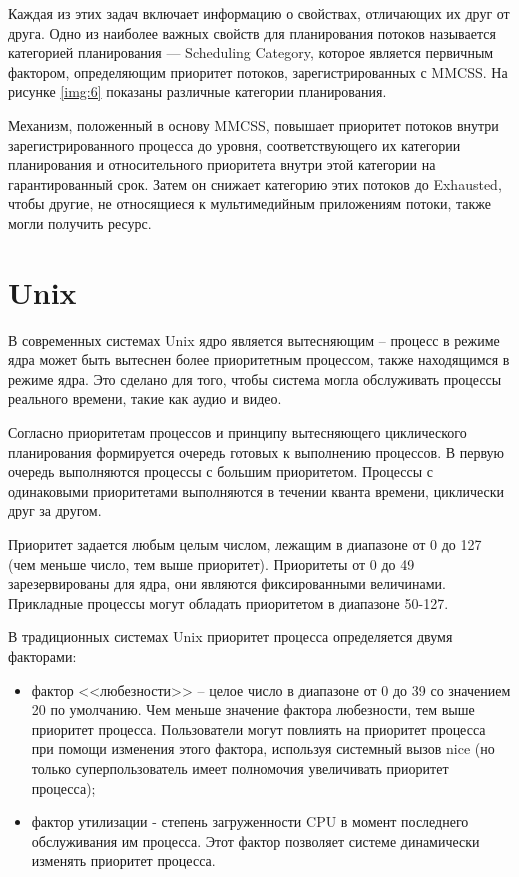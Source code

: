 Каждая из этих задач включает информацию о свойствах, отличающих их друг от друга. Одно из наиболее важных свойств для планирования потоков называется категорией планирования — Scheduling Category, которое является первичным фактором, определяющим приоритет потоков, зарегистрированных с MMCSS. На рисунке \ref{img:6} показаны различные категории планирования.




Механизм, положенный в основу MMCSS, повышает приоритет потоков
внутри зарегистрированного процесса до уровня, соответствующего их категории
планирования и относительного приоритета внутри этой категории на гарантированный срок. Затем он снижает категорию этих потоков до Exhausted, чтобы другие, не относящиеся к мультимедийным приложениям потоки, также могли получить ресурс.


\section{Unix}

В современных системах Unix ядро является вытесняющим – процесс в режиме ядра может быть вытеснен более приоритетным процессом, также находящимся в режиме ядра. Это сделано для того, чтобы система могла обслуживать процессы реального времени, такие как  аудио и видео.

Согласно приоритетам процессов и принципу вытесняющего циклического планирования формируется очередь готовых к выполнению процессов. В первую очередь выполняются процессы с большим приоритетом. Процессы с одинаковыми приоритетами выполняются в течении кванта времени, циклически друг за другом.


Приоритет задается любым целым числом, лежащим в диапазоне от 0 до 127 (чем меньше число, тем выше приоритет). Приоритеты от 0 до 49 зарезервированы для ядра, они являются фиксированными величинами. Прикладные процессы могут обладать приоритетом в диапазоне 50-127.


В традиционных системах Unix приоритет процесса определяется двумя факторами: 

\begin{itemize}
	\item фактор <<любезности>> – целое число в диапазоне от 0 до 39 со значением 20 по умолчанию. Чем меньше значение фактора любезности, тем выше приоритет процесса. Пользователи могут повлиять на приоритет процесса при помощи изменения этого фактора, используя системный вызов {\ttfamily nice} (но только суперпользователь имеет полномочия увеличивать приоритет процесса);
	
	\item фактор утилизации - степень загруженности CPU в момент последнего обслуживания им процесса. Этот фактор позволяет системе динамически изменять приоритет процесса.
\end{itemize}

